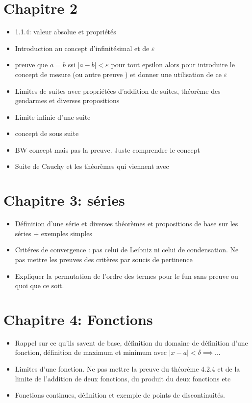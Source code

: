 \documentclass{article}
\begin{document}
\section{Chapitre 2}
\begin{itemize}
    \item 1.1.4: valeur absolue et propriétés
    \item Introduction au concept d'infinitésimal et de $\varepsilon$
    \item preuve que $a=b$ ssi $|a-b|<\varepsilon$ pour tout epsilon alors  pour introduire le concept de mesure (ou autre preuve ) et donner une utilisation de ce $\varepsilon$
    \item Limites de suites avec propriétées d'addition de suites, théorème des gendarmes et diverses propositions
    \item Limite infinie d'une suite  
    \item concept de sous suite
    \item BW concept mais pas la preuve. Juste comprendre le concept
    \item Suite de Cauchy et les théorèmes qui viennent avec
    
\end{itemize}

\section{Chapitre 3: séries}
\begin{itemize}
    \item Définition d'une série et diverses théorèmes et propositions de base sur les séries + exemples simples
    \item Critéres de convergence : pas celui de Leibniz ni celui de condensation. Ne pas mettre les preuves des critères par soucis de pertinence
    \item Expliquer la permutation de l'ordre des termes pour le fun sans preuve ou quoi que ce soit.
\end{itemize}

\section{Chapitre 4: Fonctions}
\begin{itemize}
    \item Rappel sur ce qu'ils savent de base, définition du domaine de définition d'une fonction, définition de maximum et minimum avec $|x-a|<\delta \implies ...$
    \item Limites d'une fonction. Ne pas mettre la preuve du théorème 4.2.4 et de la limite de l'addition de deux fonctions, du produit du deux fonctions etc
    \item Fonctions continues, définition et exemple de points de discontinuités.
\end{itemize}
\end{document}
